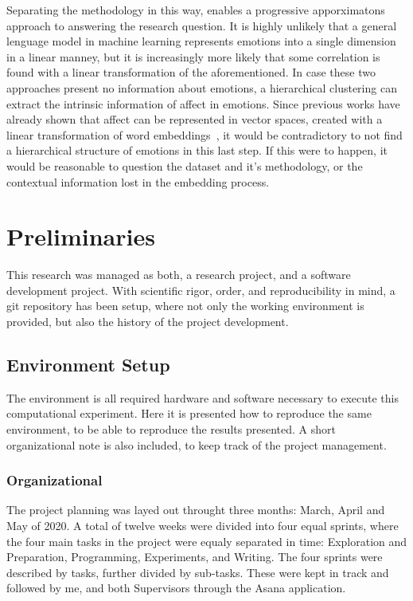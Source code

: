 Separating the methodology in this way, enables a progressive apporximatons approach to answering the research question. It is highly unlikely that a general lenguage model in machine learning represents emotions into a single dimension in a linear manney, but it is increasingly more likely that some correlation is found with a linear transformation of the aforementioned. In case these two approaches present no information about emotions, a hierarchical clustering can extract the intrinsic information of affect in emotions. Since previous works have already shown that affect can be represented in vector spaces, created with a linear transformation of word embeddings~\cite{hollis2016principals}, it would be contradictory to not find a hierarchical structure of emotions in this last step. If this were to happen, it would be reasonable to question the dataset and it's methodology, or the contextual information lost in the embedding process.

\section{Preliminaries}\label{sec:Preliminaries}
This research was managed as both, a research project, and a software development project.
With scientific rigor, order, and reproducibility in mind, a git repository has been setup, where not only the working environment is provided, but also the history of the project  development.

\subsection{Environment Setup}\label{sub:Environment Setup}
The environment is all required hardware and software necessary to execute this computational experiment. Here it is presented how to reproduce the same environment, to be able to reproduce the results presented. A short organizational note is also included, to keep track of the project management.

\subsubsection{Organizational}\label{subs:Organizational}
The project planning was layed out throught three months: March, April and May of 2020. A total of twelve weeks were divided into four equal sprints, where the four main tasks in the project were equaly separated in time: Exploration and Preparation, Programming, Experiments, and Writing. The four sprints were described by tasks, further divided by sub-tasks. These were kept in track and followed by me, and both Supervisors through the Asana application.

